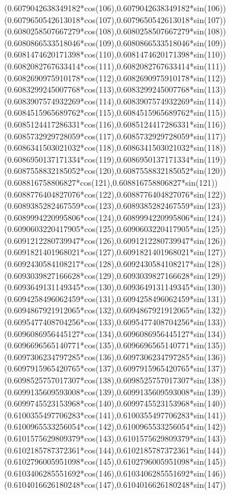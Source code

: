{({0.6079042638349182*cos(106)},{0.6079042638349182*sin(106)})
({0.6079650542613018*cos(107)},{0.6079650542613018*sin(107)})
({0.6080258507667279*cos(108)},{0.6080258507667279*sin(108)})
({0.6080866533518046*cos(109)},{0.6080866533518046*sin(109)})
({0.6081474620171398*cos(110)},{0.6081474620171398*sin(110)})
({0.6082082767633414*cos(111)},{0.6082082767633414*sin(111)})
({0.6082690975910178*cos(112)},{0.6082690975910178*sin(112)})
({0.6083299245007768*cos(113)},{0.6083299245007768*sin(113)})
({0.6083907574932269*cos(114)},{0.6083907574932269*sin(114)})
({0.6084515965689762*cos(115)},{0.6084515965689762*sin(115)})
({0.6085124417286331*cos(116)},{0.6085124417286331*sin(116)})
({0.6085732929728059*cos(117)},{0.6085732929728059*sin(117)})
({0.6086341503021032*cos(118)},{0.6086341503021032*sin(118)})
({0.6086950137171334*cos(119)},{0.6086950137171334*sin(119)})
({0.6087558832185052*cos(120)},{0.6087558832185052*sin(120)})
({0.608816758806827*cos(121)},{0.608816758806827*sin(121)})
({0.6088776404827076*cos(122)},{0.6088776404827076*sin(122)})
({0.6089385282467559*cos(123)},{0.6089385282467559*sin(123)})
({0.6089994220995806*cos(124)},{0.6089994220995806*sin(124)})
({0.6090603220417905*cos(125)},{0.6090603220417905*sin(125)})
({0.6091212280739947*cos(126)},{0.6091212280739947*sin(126)})
({0.6091821401968021*cos(127)},{0.6091821401968021*sin(127)})
({0.6092430584108217*cos(128)},{0.6092430584108217*sin(128)})
({0.6093039827166628*cos(129)},{0.6093039827166628*sin(129)})
({0.6093649131149345*cos(130)},{0.6093649131149345*sin(130)})
({0.6094258496062459*cos(131)},{0.6094258496062459*sin(131)})
({0.6094867921912065*cos(132)},{0.6094867921912065*sin(132)})
({0.6095477408704256*cos(133)},{0.6095477408704256*sin(133)})
({0.6096086956445127*cos(134)},{0.6096086956445127*sin(134)})
({0.6096696565140771*cos(135)},{0.6096696565140771*sin(135)})
({0.6097306234797285*cos(136)},{0.6097306234797285*sin(136)})
({0.6097915965420765*cos(137)},{0.6097915965420765*sin(137)})
({0.6098525757017307*cos(138)},{0.6098525757017307*sin(138)})
({0.6099135609593008*cos(139)},{0.6099135609593008*sin(139)})
({0.6099745523153968*cos(140)},{0.6099745523153968*sin(140)})
({0.6100355497706283*cos(141)},{0.6100355497706283*sin(141)})
({0.6100965533256054*cos(142)},{0.6100965533256054*sin(142)})
({0.6101575629809379*cos(143)},{0.6101575629809379*sin(143)})
({0.6102185787372361*cos(144)},{0.6102185787372361*sin(144)})
({0.6102796005951098*cos(145)},{0.6102796005951098*sin(145)})
({0.6103406285551692*cos(146)},{0.6103406285551692*sin(146)})
({0.6104016626180248*cos(147)},{0.6104016626180248*sin(147)})
}
